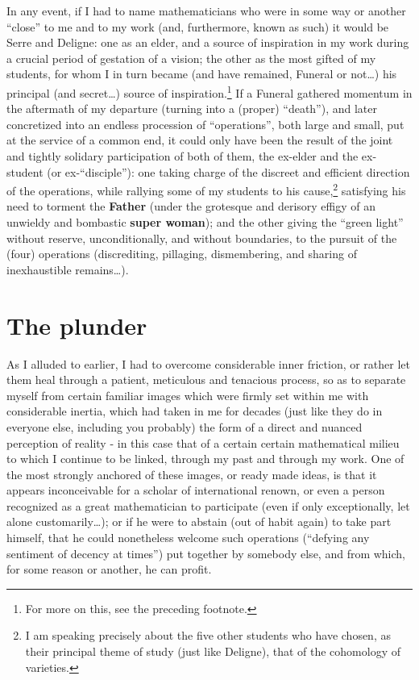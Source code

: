 In any event, if I had to name mathematicians who were in some way or another ``close'' to
me and to my work (and, furthermore, known as such) it would be Serre and Deligne: one as
an elder, and a source of inspiration in my work during a crucial period of gestation of a
vision; the other as the most gifted of my students, for whom I in turn
became (and have remained, Funeral or not\ldots) his principal (and secret\ldots)
source of inspiration.\footnote{For more on this, see the preceding footnote.}
If a Funeral gathered momentum in the aftermath of my departure (turning into a (proper)
``death''), and later concretized into an endless procession of ``operations'', both large
and small, put at the service of a common end, it could only have been the result of the 
joint and tightly solidary participation of both of them, the ex-elder and the ex-student
(or ex-``disciple''): one taking charge of the 
discreet and efficient direction of the operations, while rallying some of my students to his cause,\footnote{I am speaking
precisely about the five other students who have chosen, as their principal theme of
study
(just like Deligne), that of the cohomology of varieties.}
satisfying his need to torment the \textbf{Father}
(under the grotesque and derisory effigy of an unwieldy and 
bombastic \textbf{super woman}); and the other giving the ``green light'' without reserve,
unconditionally, and without boundaries, to the pursuit of the (four) operations
(discrediting, pillaging, dismembering, and sharing of inexhaustible remains\ldots).

\section{The plunder}

As I alluded to earlier, I had to overcome considerable inner friction, 
or rather let them heal through a patient, meticulous and tenacious process, so as to
separate myself from certain familiar images which were firmly set within me
with considerable inertia, which had taken 
in me for decades (just like they do in everyone else, including you probably)
the form of a direct and nuanced perception of reality - 
in this case that of a certain certain mathematical milieu
to which I continue to be 
linked, through my past and through my work. 
One of the most strongly anchored of these images, or ready made ideas, is that it appears
inconceivable for a scholar of international renown, 
or even a person recognized as a great mathematician to participate
(even if only exceptionally, let alone customarily\ldots); or if he were to abstain 
(out of habit again) to take part himself, that he could nonetheless welcome such
operations (``defying any sentiment of decency at times'') put together by somebody else,
and from which, for some reason or another, he can profit. 

